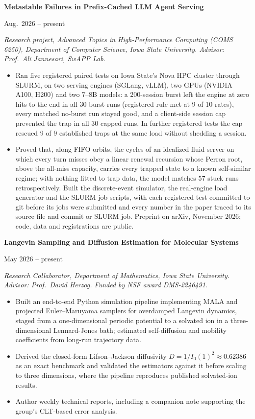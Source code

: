 \documentclass[11pt]{article}
\newcommand{\entry}[2]{%
  \noindent\begin{minipage}[t]{0.78\textwidth}\raggedright\textbf{#1}\end{minipage}%
  \hfill%
  \begin{minipage}[t]{0.22\textwidth}\raggedleft #2\end{minipage}\par\vspace{0.1em}}
\newcommand{\subentry}[1]{\noindent\textit{#1}\par\vspace{0.15em}}
\begin{document}
\entry{Metastable Failures in Prefix-Cached LLM Agent Serving}{Aug.\ 2026 -- present}
\subentry{Research project, Advanced Topics in High-Performance Computing
(COMS 6250), Department of Computer Science, Iowa State University.
Advisor: Prof.\ Ali Jannesari, SwAPP Lab.}
\begin{itemize}
  \item Ran five registered paired tests on Iowa State's Nova HPC cluster through SLURM,
    on two serving engines (SGLang, vLLM), two GPUs (NVIDIA A100, H200) and two
    7--8B models: a 200-session burst left the engine at zero hits to the end in all
    30 burst runs (registered rule met at 9 of 10 rates), every matched no-burst run
    stayed good, and a client-side session cap prevented the trap in all 30 capped
    runs. In further registered tests the cap rescued 9 of 9 established traps at
    the same load without shedding a session.
  \item Proved that, along FIFO orbits, the cycles of an idealized fluid server on which
    every turn misses obey a linear renewal recursion whose Perron root, above the
    all-miss capacity, carries every trapped state to a known self-similar regime;
    with nothing fitted to trap data, the model matches 57 stuck runs
    retrospectively. Built the discrete-event simulator, the real-engine load
    generator and the SLURM job scripts, with each registered test committed to git
    before its jobs were submitted and every number in the paper traced to its source
    file and commit or SLURM job. Preprint on arXiv, November 2026; code, data and
    registrations are public.
\end{itemize}

\vspace{0.35em}
\entry{Langevin Sampling and Diffusion Estimation for Molecular Systems}{May 2026 -- present}
\subentry{Research Collaborator, Department of Mathematics, Iowa State University.
Advisor: Prof.\ David Herzog. Funded by NSF award DMS-2246491.}
\begin{itemize}
  \item Built an end-to-end Python simulation pipeline implementing MALA and projected
    Euler--Maruyama samplers for overdamped Langevin dynamics, staged from a
    one-dimensional periodic potential to a solvated ion in a three-dimensional
    Lennard-Jones bath; estimated self-diffusion and mobility coefficients from
    long-run trajectory data.
  \item Derived the closed-form Lifson--Jackson diffusivity
    $D = 1/I_0(1)^2 \approx 0.62386$ as an exact benchmark and validated the estimators
    against it before scaling to three dimensions, where the pipeline reproduces
    published solvated-ion results.
  \item Author weekly technical reports, including a companion note supporting the
    group's CLT-based error analysis.
\end{itemize}
\end{document}
